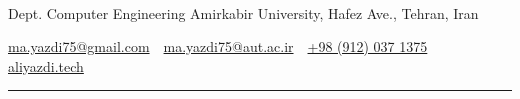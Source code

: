 \documentclass[letterpaper,MMMyyyy,nonstopmode]{resume}
\newcommand{\CVAuthor}{Ali Yazdi}
\newcommand{\CVWebpageName}{aliyazdi.tech}
\newcommand{\CVWebpage}{https://aliyazdi.tech/}
\begin{document}

\Title{\CVAuthor}

\begin{SubTitle}
\normalsize{
\href{https://www.linkedin.com/in/aliyazdi75}
{\faLinkedin}
\,\SubBulletSymbol\,
\href{https://github.com/aliyazdi75}
{\faGithub}
\,\SubBulletSymbol\,
\href{https://twitter.com/aliyazdi75}
{\faTwitter}
\,\SubBulletSymbol\,
\href{https://join.skype.com/invite/h3jUqpJH9jLh}
{\faSkype}
\,\SubBulletSymbol\,
\href{https://t.me/aliyazdi75}
{\faTelegram}
\,\SubBulletSymbol\,
\href{mailto:ma.yazdi75@gmail.com}
{\faEnvelope}
\,\SubBulletSymbol\,
\href{tel:+989120371375}
{\faPhone}
\,\SubBulletSymbol\,
\href{\CVWebpage}
{\faGlobe}
}
\par
Dept. Computer Engineering Amirkabir University, Hafez Ave., Tehran, Iran
\par
\href{mailto:ma.yazdi75@gmail.com}
{ma.yazdi75@gmail.com}
\,\SubBulletSymbol\,
\href{mailto:ma.yazdi75@aut.ac.ir}
{ma.yazdi75@aut.ac.ir}
\,\SubBulletSymbol\,
\href{tel:+989120371375}
{+98 (912) 037 1375}
\,\SubBulletSymbol\,
\href{\CVWebpage}
{\CVWebpageName}
\end{SubTitle}

\smallskip\hrule
\end{document}
